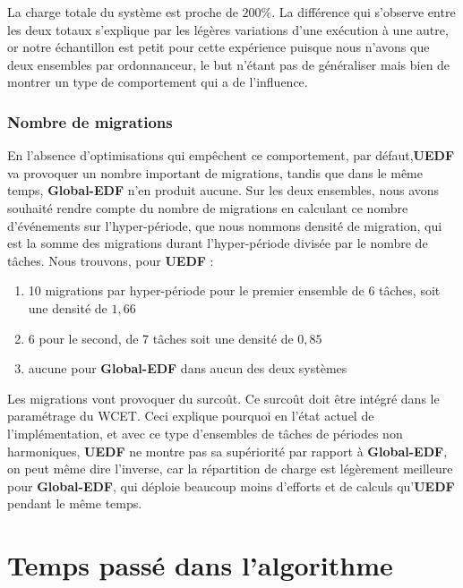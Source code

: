	La charge totale du système est proche de $200\%$. La différence qui s'observe 
	entre les deux totaux s'explique par les légères variations d'une exécution à une autre, or notre échantillon est 
	petit pour cette expérience puisque nous n'avons que deux ensembles par ordonnanceur, le but n'étant pas de 
	généraliser mais bien de montrer un type de comportement qui a de l'influence.\newline
	
	
	\subsubsection{Nombre de migrations}
	
	En l'absence d'optimisations qui empêchent ce comportement, par défaut,\textbf{UEDF} va provoquer un nombre 
	important de migrations, tandis que dans le même temps, \textbf{Global-EDF} n'en produit aucune.
	Sur les deux ensembles, nous avons souhaité rendre compte du nombre de migrations en calculant 
	ce nombre d'événements sur l'hyper-période, que nous nommons \og{}densité de migration\fg{}, qui est 
	la somme des migrations durant l'hyper-période divisée par le nombre de tâches. 
	Nous trouvons, pour \textbf{UEDF} : 
	\begin{enumerate}
		\item 10 migrations par hyper-période pour le premier ensemble de 6 tâches, soit une densité de $1,66$
		\item 6 pour le second, de 7 tâches soit une densité de $0,85$
		\item aucune pour \textbf{Global-EDF} dans aucun des deux systèmes
	\end{enumerate}

	Les migrations vont provoquer du surcoût. Ce surcoût doit être intégré dans le paramétrage du WCET. 
	Ceci explique pourquoi en l'état actuel de l'implémentation, et avec ce type d'ensembles de tâches 
	de périodes non harmoniques, \textbf{UEDF} ne montre pas sa 
	supériorité par rapport à \textbf{Global-EDF}, on peut même dire l'inverse, car 
	la répartition de charge est légèrement meilleure pour \textbf{Global-EDF}, qui déploie 
	beaucoup moins d'efforts et de calculs qu'\textbf{UEDF} pendant le même temps.\newline
	
	
	\section{Temps passé dans l'algorithme}
	
